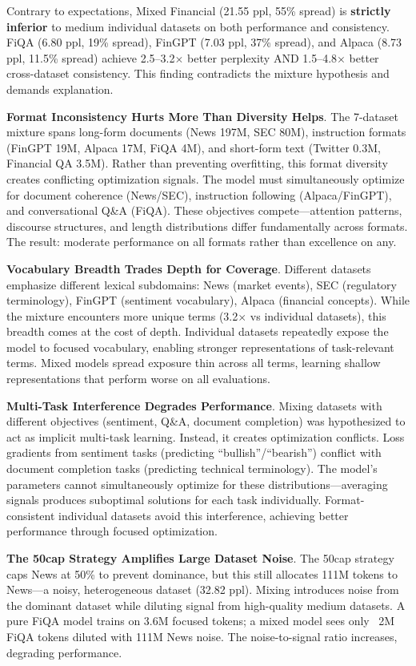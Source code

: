Contrary to expectations, Mixed Financial (21.55 ppl, 55\% spread) is \textbf{strictly inferior} to medium individual datasets on both performance and consistency. FiQA (6.80 ppl, 19\% spread), FinGPT (7.03 ppl, 37\% spread), and Alpaca (8.73 ppl, 11.5\% spread) achieve 2.5–3.2$\times$ better perplexity AND 1.5–4.8$\times$ better cross-dataset consistency. This finding contradicts the mixture hypothesis and demands explanation.

\textbf{Format Inconsistency Hurts More Than Diversity Helps}. The 7-dataset mixture spans long-form documents (News 197M, SEC 80M), instruction formats (FinGPT 19M, Alpaca 17M, FiQA 4M), and short-form text (Twitter 0.3M, Financial QA 3.5M). Rather than preventing overfitting, this format diversity creates conflicting optimization signals. The model must simultaneously optimize for document coherence (News/SEC), instruction following (Alpaca/FinGPT), and conversational Q\&A (FiQA). These objectives compete—attention patterns, discourse structures, and length distributions differ fundamentally across formats. The result: moderate performance on all formats rather than excellence on any.

\textbf{Vocabulary Breadth Trades Depth for Coverage}. Different datasets emphasize different lexical subdomains: News (market events), SEC (regulatory terminology), FinGPT (sentiment vocabulary), Alpaca (financial concepts). While the mixture encounters more unique terms (3.2$\times$ vs individual datasets), this breadth comes at the cost of depth. Individual datasets repeatedly expose the model to focused vocabulary, enabling stronger representations of task-relevant terms. Mixed models spread exposure thin across all terms, learning shallow representations that perform worse on all evaluations.

\textbf{Multi-Task Interference Degrades Performance}. Mixing datasets with different objectives (sentiment, Q\&A, document completion) was hypothesized to act as implicit multi-task learning. Instead, it creates optimization conflicts. Loss gradients from sentiment tasks (predicting ``bullish''/``bearish'') conflict with document completion tasks (predicting technical terminology). The model's parameters cannot simultaneously optimize for these distributions—averaging signals produces suboptimal solutions for each task individually. Format-consistent individual datasets avoid this interference, achieving better performance through focused optimization.

\textbf{The 50cap Strategy Amplifies Large Dataset Noise}. The 50cap strategy caps News at 50\% to prevent dominance, but this still allocates 111M tokens to News—a noisy, heterogeneous dataset (32.82 ppl). Mixing introduces noise from the dominant dataset while diluting signal from high-quality medium datasets. A pure FiQA model trains on 3.6M focused tokens; a mixed model sees only ~2M FiQA tokens diluted with 111M News noise. The noise-to-signal ratio increases, degrading performance.

